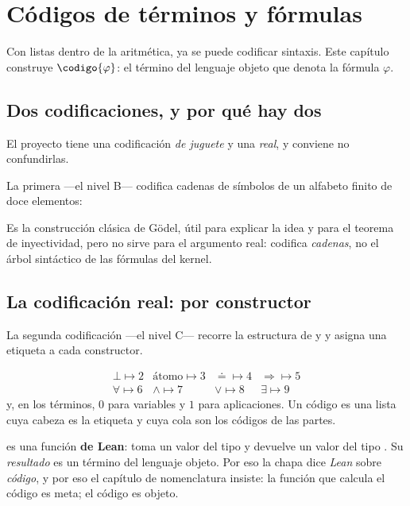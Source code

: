 \chapter{Códigos de términos y fórmulas}
\label{cap:codigos}

Con listas dentro de la aritmética, ya se puede codificar sintaxis. Este capítulo construye
\(\codigo{\varphi}\): el término del lenguaje objeto que denota la fórmula \(\varphi\).

\section{Dos codificaciones, y por qué hay dos}

El proyecto tiene una codificación \emph{de juguete} y una \emph{real}, y conviene no confundirlas.

La primera —el nivel B— codifica cadenas de símbolos de un alfabeto finito de doce elementos:


\noindent Es la construcción clásica de Gödel, útil para explicar la idea y para el teorema de
inyectividad, pero no sirve para el argumento real: codifica \emph{cadenas}, no el árbol sintáctico
de las fórmulas del kernel.

\section{La codificación real: por constructor}

La segunda codificación —el nivel C— recorre la estructura de  y  y
asigna una etiqueta a cada constructor.


\begin{matematica}
\[
\begin{array}{llll}
\bot \mapsto 2 & \text{átomo} \mapsto 3 & {\doteq} \mapsto 4 & {\Rightarrow} \mapsto 5\\
\forall \mapsto 6 & \wedge \mapsto 7 & \vee \mapsto 8 & \exists \mapsto 9
\end{array}
\]
y, en los términos, \(0\) para variables y \(1\) para aplicaciones. Un código es una lista cuya
cabeza es la etiqueta y cuya cola son los códigos de las partes.
\end{matematica}

\begin{leccion}
 es una función \textbf{de Lean}: toma un valor del tipo  y devuelve
un valor del tipo . Su \emph{resultado} es un término del lenguaje objeto. Por eso la
chapa dice \emph{Lean} sobre \emph{código}, y por eso el capítulo de nomenclatura insiste: la
función que calcula el código es meta; el código es objeto.
\end{leccion}

